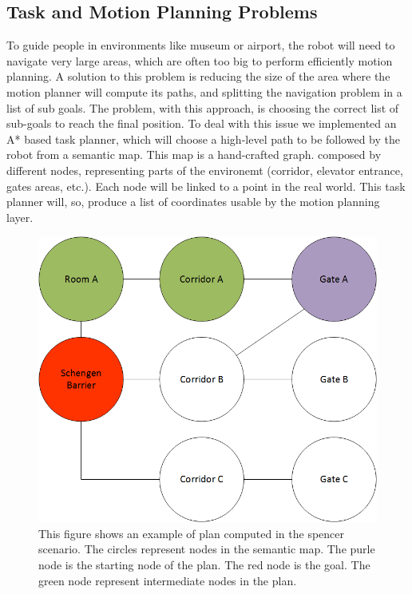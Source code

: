 \subsection{Task and Motion Planning Problems}
\label{subsec:case_study-spencer-planning}
To guide people in environments like museum or airport, the robot will need to navigate very large areas, which are often too big to perform efficiently motion planning. A solution to this problem is reducing the size of the area where the motion planner will compute its paths, and splitting the navigation problem in a list of sub goals. The problem, with this approach,  is choosing the correct list of sub-goals to reach the final position.  To deal with this issue we implemented an A* based task planner, which will choose a high-level path to be followed by the robot from a semantic map. This map is a hand-crafted graph. composed by different nodes, representing parts of the environemt (corridor, elevator entrance, gates areas, etc.). Each node will be linked to a point in the real world. This task planner will, so, produce a list of coordinates usable by the motion planning layer. 

\begin{figure}[ht!]
	\centering
	\includegraphics[scale=0.45]{img/case_study/spencer/ShengenTaskPlanner.png}
	\caption{This figure shows an example of plan computed in the spencer scenario. The circles represent nodes in the semantic map. The purle node is the starting node of the plan. The red node is the goal. The green node represent intermediate nodes in the plan.}
	\label{fig:case_study-spencer-semantic_plan}
\end{figure}


